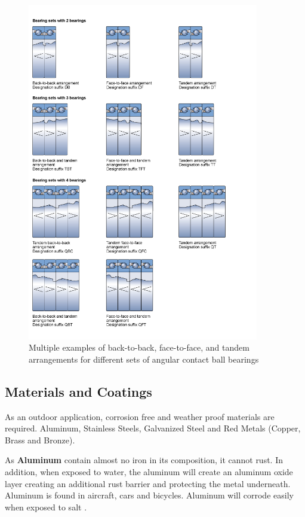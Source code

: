\begin{figure}[H]
    \centering
    \includegraphics[width=0.9\textwidth]{Sections/Appendices/bearings_arrang.png}
    \caption{Multiple examples of back-to-back, face-to-face, and tandem arrangements for different sets of angular contact ball bearings \cite{skf_bearing_nodate}}
    \label{fig:bearing_arrang}
\end{figure}


\subsection{Materials and Coatings} \label{app:materials}

As an outdoor application, corrosion free and weather proof materials are required. Aluminum, Stainless Steels, Galvanized Steel and Red Metals (Copper, Brass and Bronze)\cite{media_metals_2018}\cite{form_best_nodate}\cite{noauthor_4_2018}.

As \textbf{Aluminum} contain almost no iron in its composition, it cannot rust. In addition, when exposed to water, the aluminum will create an aluminum oxide layer creating an additional rust barrier and protecting the metal underneath. Aluminum is found in aircraft, cars and bicycles. Aluminum will corrode easily when exposed to salt \cite{media_metals_2018}\cite{form_best_nodate}\cite{noauthor_4_2018}.

